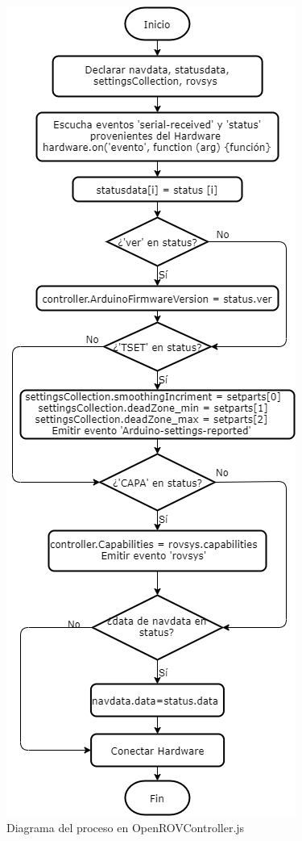 \begin{figure}[H]
    \centering
    \includegraphics[scale=0.63]{partes/ImgSophia/ApendiceC/DiagramaOpenROVController.png}
    \caption{Diagrama del proceso en OpenROVController.js}
    \label{fig:DiagOROVController}
\end{figure}

